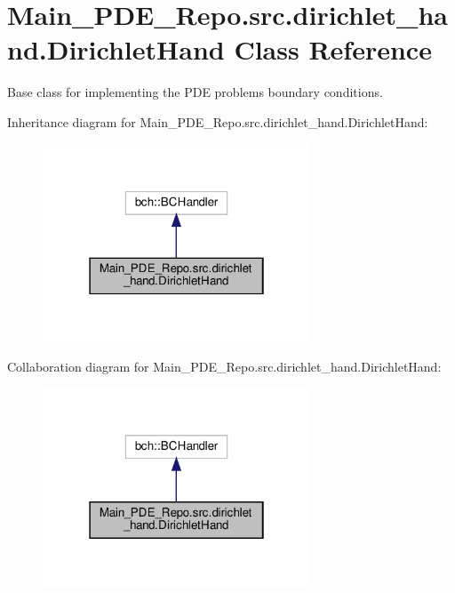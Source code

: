 \hypertarget{classMain__PDE__Repo_1_1src_1_1dirichlet__hand_1_1DirichletHand}{}\section{Main\+\_\+\+P\+D\+E\+\_\+\+Repo.\+src.\+dirichlet\+\_\+hand.\+Dirichlet\+Hand Class Reference}
\label{classMain__PDE__Repo_1_1src_1_1dirichlet__hand_1_1DirichletHand}


Base class for implementing the P\+DE problem\textquotesingle{}s boundary conditions.  




Inheritance diagram for Main\+\_\+\+P\+D\+E\+\_\+\+Repo.\+src.\+dirichlet\+\_\+hand.\+Dirichlet\+Hand\+:
\nopagebreak
\begin{figure}[H]
\begin{center}
\leavevmode
\includegraphics[width=226pt]{classMain__PDE__Repo_1_1src_1_1dirichlet__hand_1_1DirichletHand__inherit__graph}
\end{center}
\end{figure}


Collaboration diagram for Main\+\_\+\+P\+D\+E\+\_\+\+Repo.\+src.\+dirichlet\+\_\+hand.\+Dirichlet\+Hand\+:
\nopagebreak
\begin{figure}[H]
\begin{center}
\leavevmode
\includegraphics[width=226pt]{classMain__PDE__Repo_1_1src_1_1dirichlet__hand_1_1DirichletHand__coll__graph}
\end{center}
\end{figure}
